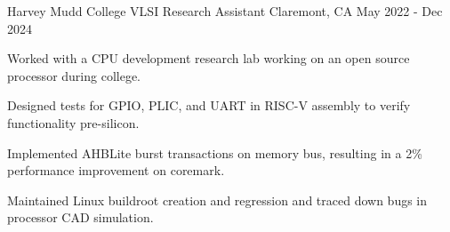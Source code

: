   \begin{cventry}
    {Harvey Mudd College} %
    {VLSI Research Assistant} %
    {Claremont, CA} %
    {May 2022 - Dec 2024} %
    {
    \begin{cvitems}
      \item {
      Worked with a CPU development research lab working on an open source processor during college.
      }
      \item{
      Designed tests for GPIO, PLIC, and UART in RISC-V assembly to verify functionality pre-silicon.
      }
      \item{
      Implemented AHBLite burst transactions on memory bus, resulting in a 2\% performance improvement on coremark.
      }
      \item {
      Maintained Linux buildroot creation and regression and traced down bugs in processor CAD simulation.
      }
    \end{cvitems}
    }
  \end{cventry}
